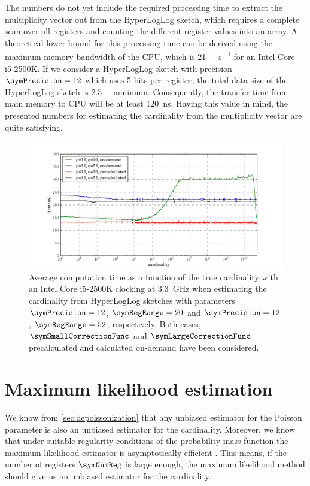 \documentclass[a4paper]{scrartcl}
\begin{document}
The numbers do not yet include the required processing time to extract the multiplicity vector out from the HyperLogLog sketch, which requires a complete scan over all registers and counting the different register values into an array. A theoretical lower bound for this processing time can be derived using the maximum memory bandwidth of the CPU, which is \SI[per-mode=symbol]{21}{\giga\byte\per\second} for an Intel Core i5-2500K. If we consider a HyperLogLog sketch with precision $\symPrecision=12$ which uses 5 bits per register, the total data size of the HyperLogLog sketch is \SI{2.5}{\kilo\byte} minimum. Consequently, the transfer time from main memory to CPU will be at least \SI{120}{\nano\second}. Having this value in mind, the presented numbers for estimating the cardinality from the multiplicity vector are quite satisfying. 

\begin{figure}
\centering
\includegraphics[width=1\textwidth]{corrected_raw_avg_exec_time}
\caption{Average computation time as a function of the true cardinality with an Intel Core i5-2500K clocking at \SI{3.3}{\giga\hertz} when estimating the cardinality from HyperLogLog sketches with parameters $\symPrecision=12$, $\symRegRange=20$ and $\symPrecision=12$, $\symRegRange=52$, respectively. Both cases, $\symSmallCorrectionFunc$ and $\symLargeCorrectionFunc$ precalculated and calculated on-demand have been considered.}
\label{fig:corrected_raw_avg_exec_time}
\end{figure}

\section{Maximum likelihood estimation}
\label{sec:max_likelihood_estimation}
We know from \cref{sec:depoissonization} that any unbiased estimator for the Poisson parameter is also an unbiased estimator for the cardinality. Moreover, we know that under suitable regularity conditions of the probability mass function the maximum likelihood estimator is asymptotically efficient \cite{Casella2002}. This means, if the number of registers $\symNumReg$ is large enough, the maximum likelihood method should give us an unbiased estimator for the cardinality.
\end{document}
